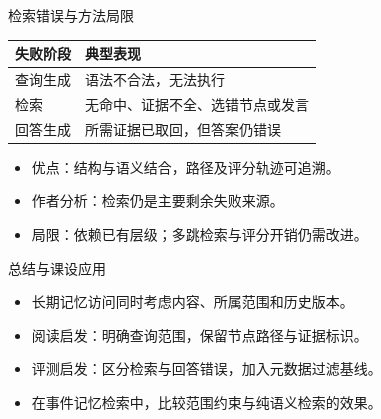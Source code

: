 \begin{frame}{检索错误与方法局限}
    \begin{tabularx}{\linewidth}{@{}p{28mm}Y@{}}
        \toprule 失败阶段 & 典型表现 \\
        \midrule
        查询生成 & 语法不合法，无法执行 \\
        检索 & 无命中、证据不全、选错节点或发言 \\
        回答生成 & 所需证据已取回，但答案仍错误 \\
        \bottomrule
    \end{tabularx}
    \par\vspace{5mm}
    \begin{itemize}\setlength{\itemsep}{2mm}
        \item 优点：结构与语义结合，路径及评分轨迹可追溯。
        \item 作者分析：检索仍是主要剩余失败来源。
        \item 局限：依赖已有层级；多跳检索与评分开销仍需改进。
    \end{itemize}
\end{frame}

\begin{frame}{总结与课设应用}
    \begin{itemize}\setlength{\itemsep}{4mm}
        \item 长期记忆访问同时考虑内容、所属范围和历史版本。
        \item 阅读启发：明确查询范围，保留节点路径与证据标识。
        \item 评测启发：区分检索与回答错误，加入元数据过滤基线。
        \item 在事件记忆检索中，比较范围约束与纯语义检索的效果。
    \end{itemize}

\end{frame}
